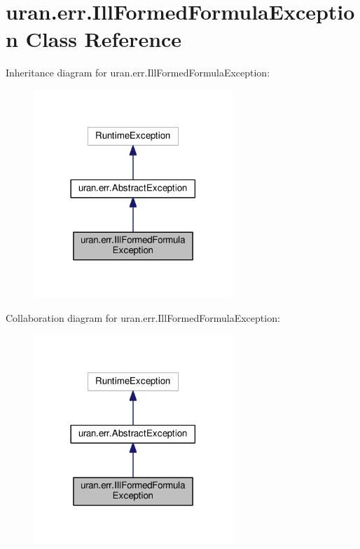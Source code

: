 \hypertarget{classuran_1_1err_1_1_ill_formed_formula_exception}{}\section{uran.\+err.\+Ill\+Formed\+Formula\+Exception Class Reference}
\label{classuran_1_1err_1_1_ill_formed_formula_exception}


Inheritance diagram for uran.\+err.\+Ill\+Formed\+Formula\+Exception\+:
\nopagebreak
\begin{figure}[H]
\begin{center}
\leavevmode
\includegraphics[width=213pt]{classuran_1_1err_1_1_ill_formed_formula_exception__inherit__graph}
\end{center}
\end{figure}


Collaboration diagram for uran.\+err.\+Ill\+Formed\+Formula\+Exception\+:
\nopagebreak
\begin{figure}[H]
\begin{center}
\leavevmode
\includegraphics[width=213pt]{classuran_1_1err_1_1_ill_formed_formula_exception__coll__graph}
\end{center}
\end{figure}
